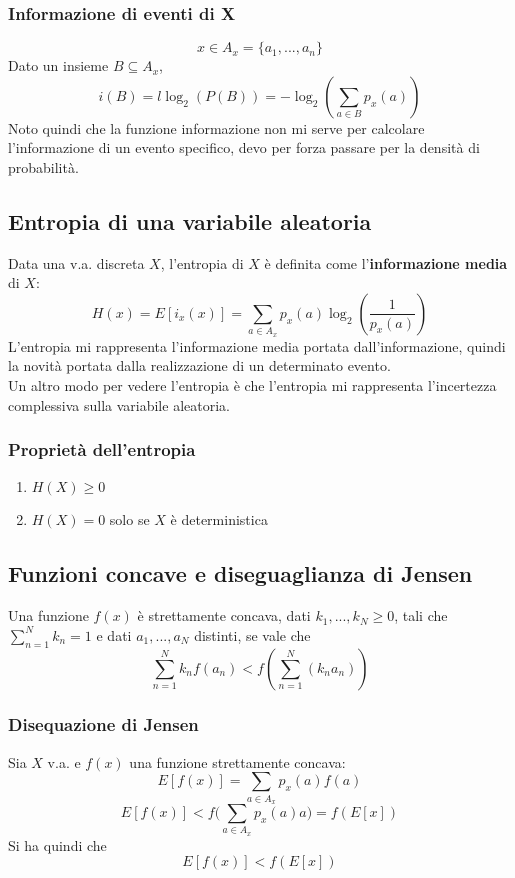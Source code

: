 \documentclass{article}
\begin{document}
\subsubsection{Informazione di eventi di X}
$$x\in A_x=\{a_1,...,a_n\}$$
Dato un insieme $B\subseteq A_x$,
$$i(B)=l\log_2(P(B))=-\log_2(\sum_{a\in B}p_x(a))$$
Noto quindi che la funzione informazione non mi serve per calcolare l'informazione di un evento specifico, devo per forza passare per la densità di probabilità.\\

\subsection{Entropia di una variabile aleatoria}
Data una v.a. discreta $X$, l'entropia di $X$ è definita come l'\textbf{informazione media} di $X$:
$$H(x)=E[i_x(x)]=\sum_{a\in A_x}p_x(a)\log_2(\frac{1}{p_x(a)})$$
L'entropia mi rappresenta l'informazione media portata dall'informazione, quindi la novità portata dalla realizzazione di un determinato evento.\\
Un altro modo per vedere l'entropia è che l'entropia mi rappresenta l'incertezza complessiva sulla variabile aleatoria.

\subsubsection{Proprietà dell'entropia}
\begin{enumerate}
	\item $H(X)\geq0$
	\item $H(X)=0$ solo se $X$ è deterministica
\end{enumerate}

\subsection{Funzioni concave e diseguaglianza di Jensen}
Una funzione $f(x)$ è strettamente concava, dati $k_1,...,k_N\geq0$, tali che $\sum_{n=1}^Nk_n=1$ e dati $a_1,...,a_N$ distinti, se vale che
$$\sum_{n=1}^Nk_nf(a_n)<f(\sum_{n=1}^N(k_na_n))$$

\subsubsection{Disequazione di Jensen}
Sia $X$ v.a. e $f(x)$ una funzione strettamente concava:
$$E[f(x)]=\sum_{a\in A_x}p_x(a)f(a)$$
$$E[f(x)]<f\biggl(\sum_{a\in A_x}p_x(a)a\biggl)=f(E[x])$$
Si ha quindi che
$$E[f(x)]<f(E[x])$$
\end{document}
